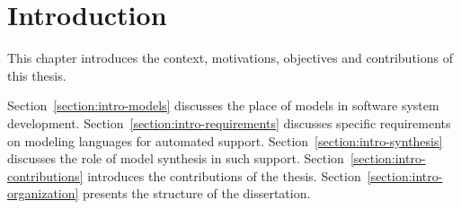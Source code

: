 \chapter{Introduction\label{chap:introduction}}

This chapter introduces the context, motivations, objectives and contributions of this thesis.

Section~\ref{section:intro-models} discusses the place of models in software system development. Section~\ref{section:intro-requirements} discusses specific requirements on modeling languages for automated support. Section~\ref{section:intro-synthesis} discusses the role of model synthesis in such support. Section~\ref{section:intro-contributions} introduces the contributions of the thesis. Section~\ref{section:intro-organization} presents the structure of the dissertation.






